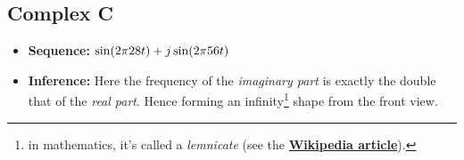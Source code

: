 \documentclass[../../course]{subfiles}
\begin{document}
\subsection{Complex C}

\begin{itemize} [label=]

    \item \textbf{Sequence:} $\sin(2 \pi 28 t) + j \sin(2 \pi 56 t)$

    \item \textbf{Inference:} Here the frequency of the \emph{imaginary part} is exactly the
        double that of the \emph{real part}. Hence forming an infinity\footnote{in mathematics, it's
        called a \emph{lemnicate} (see the \textbf{\href{https://en.m.wikipedia.org/wiki/Lemniscate_of_Bernoulli}
        {Wikipedia article}}).} shape from the front view.

\end{itemize}
\end{document}
